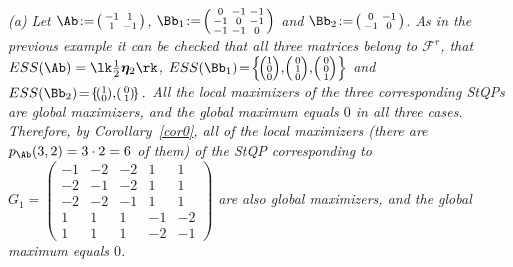 \documentclass[moor]{informs3}              %
\begin{document}
\begin{exa}\label{ex:cor0}
\emph{(a) Let $\Ab\!:=\!\left(\begin{smallmatrix}-1&1\\1&-1\end{smallmatrix}\right)$, $\Bb_1\!:=\!\left(\begin{smallmatrix}0&-1&-1\\-1&0&-1\\-1&-1&0\end{smallmatrix}\right)$ and $\Bb_2\!:=\!\left(\begin{smallmatrix}0&-1\\-1&0\end{smallmatrix}\right)$. As in the previous example it can be checked that all three matrices belong to ${\mathcal F}^r$,
that $ESS(\Ab) = \lk \frac 12 {\bm\eta}_2\rk$,
$ESS(\Bb_1)\!=\!\left\{\!\left(\!\begin{smallmatrix}1\\0\\0\end{smallmatrix}\!\right)\!,\!\left(\begin{smallmatrix}0\\1\\0\end{smallmatrix}\!\right)\!,
\!\left(\begin{smallmatrix}0\\0\\1\end{smallmatrix}\!\right)\right\}$ and
$ESS(\Bb_2)\!=\!\left\{\!\left(\!\begin{smallmatrix}1\\0\end{smallmatrix}\!\right)\!,\!\left(\begin{smallmatrix}0\\1\end{smallmatrix}\!\right)\!\right\}.$
All the local maximizers of the three corresponding StQPs are global maximizers, and the global maximum equals $0$ in all three cases. Therefore, by Corollary~\ref{cor0},
all of the local maximizers (there are $p_\Ab(3,2)=3\cdot2=6$ of them)
of the StQP corresponding to
$G_1=\left(\begin{smallmatrix}-1&-2&-2&1&1\\-2&-1&-2&1&1\\-2&-2&-1&1&1\\1&1&1&-1&-2\\1&1&1&-2&-1\end{smallmatrix}\right)$
are also global maximizers, and the global maximum equals $0$.\\
}
\end{exa}
\end{document}
